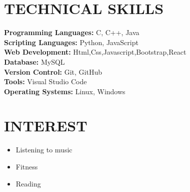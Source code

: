 \documentclass[a4paper,10pt]{article}
\begin{document}
	\vspace{0.2cm}
	
	\section*{TECHNICAL SKILLS}
	\begin{multicols}{2}
		\textbf{Programming Languages:} C, C++, Java \\
		\textbf{Scripting Languages:} Python, JavaScript \\
		\textbf{Web Development:} Html,Css,Javascript,Bootstrap,React \\
		\columnbreak
		\textbf{Database:} MySQL \\
		\textbf{Version Control:} Git, GitHub \\
		\textbf{Tools:} Visual Studio Code \\
		\textbf{Operating Systems:} Linux, Windows
	\end{multicols}
	
	
	\section*{INTEREST}
	\vspace{0.2cm}
	
	\begin{itemize}[]
		\item Listening to music
		\item Fitness
		\item Reading
	\end{itemize}
	
	\vspace{0.2cm}
	
\end{document}
